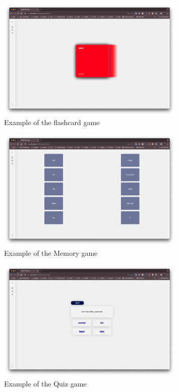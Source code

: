 \documentclass[12pt]{article}
\begin{document}
    \begin{figure}
      \centering
      \caption{
      Example of the flashcard game 
      }
      \label{fig:site6}
      \includegraphics[width=0.8\textwidth]{assets/6.png}
    \end{figure}


    \begin{figure}
      \centering
      \caption{
      Example of the Memory game 
      }
      \label{fig:site7}
      \includegraphics[width=0.8\textwidth]{assets/7.png}
    \end{figure}

    \begin{figure}
      \centering
      \caption{
      Example of the Quiz game 
      }
      \label{fig:site8}
      \includegraphics[width=0.8\textwidth]{assets/8.png}
    \end{figure}
\end{document}
